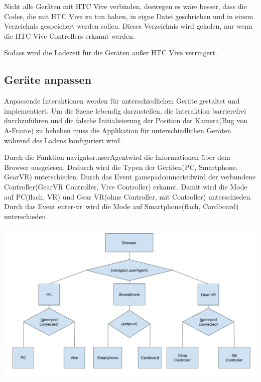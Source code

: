   Nicht alle Geräten mit HTC Vive verbinden, deswegen es wäre besser, dass die Codes, die mit HTC Vive zu tun haben, in eigne Datei geschrieben und in einem Verzeichnis gespeichert werden sollen. Dieses Verzeichnis wird geladen, nur wenn die HTC Vive Controllers erkannt werden.
  
  Sodass wird die Ladezeit für die Geräten außer HTC Vive verringert.
  
 \subsection{Geräte anpassen}
 Anpassende Interaktionen werden für unterschiedlichen Geräte gestaltet und implementiert. Um die Szene lebendig darzustellen, die Interaktion barrierefrei durchzuführen und die falsche Initialisierung der Position der Kamera(Bug von A-Frame) zu beheben muss die Applikation für unterschiedlichen Geräten während des Ladens konfiguriert wird.
 
 Durch die Funktion \glqq navigator.userAgent\grqq wird die Informationen über dem Browser ausgelesen. Dadurch wird die Typen der Geräten(PC, Smartphone, GearVR) unterschieden. Durch das Event \glqq gamepadconnected\grqq wird der verbundene Controller(GearVR Controller, Vive Controller) erkannt. Damit wird die Mode auf PC(flach, VR) und Gear VR(ohne Controller, mit Controller) unterschieden. Durch das Event \glqq enter-vr\grqq\ wird die Mode auf Smartphone(flach, Cardboard) unterschieden.
 
 \includegraphics[width=\textwidth]{images/geraeteAnpassen.png}

